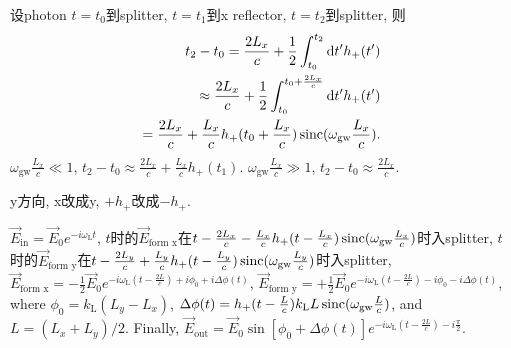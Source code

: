 设photon $t=t_0$到splitter, $t=t_1$到x reflector, $t=t_2$到splitter, 则
\begin{eqnarray}
    t_2-t_0=\frac{2L_x}{c}+\frac{1}{2}\int^{t_2}_{t_0}\mathrm{d} t'h_+(t')\\
    \approx\frac{2L_x}{c}+\frac{1}{2}\int^{t_0+\frac{2L_x}{c}}_{t_0}\mathrm{d} t'h_+(t')\\
    =\frac{2L_x}{c}+\frac{L_x}{c}h_+(t_0+\frac{L_x}{c})\operatorname{sinc}(\omega_\text{gw}\frac{L_x}{c}).
\end{eqnarray}
$\omega_\text{gw}\frac{L_x}{c}\ll1$, $t_2-t_0\approx\frac{2L_x}{c}+\frac{L_x}{c}h_+(t_1)$. $\omega_\text{gw}\frac{L_x}{c}\gg1$, $t_2-t_0\approx\frac{2L_x}{c}$.

y方向, x改成y, $+h_+$改成$-h_+$.

$\vec{E}_\text{in}=\vec{E}_0e^{-i\omega_\text{L}t}$, $t$时的$\vec{E}_\text{form x}$在$t-\frac{2L_x}{c}-\frac{L_x}{c}h_+(t-\frac{L_x}{c})\operatorname{sinc}(\omega_\text{gw}\frac{L_x}{c})$时入splitter, $t$时的$\vec{E}_\text{form y}$在$t-\frac{2L_y}{c}+\frac{L_y}{c}h_+(t-\frac{L_y}{c})\operatorname{sinc}(\omega_\text{gw}\frac{L_y}{c})$时入splitter, $\vec{E}_\text{form x}=-\frac{1}{2}\vec{E}_0e^{-i\omega_\text{L}(t-\frac{2L}{c})+i\phi_0+i\Delta\phi(t)}$, $\vec{E}_\text{form y}=+\frac{1}{2}\vec{E}_0e^{-i\omega_\text{L}(t-\frac{2L}{c})-i\phi_0-i\Delta\phi(t)}$, where $\phi_0=k_\text{L}(L_y-L_x)$, $\Delta\phi(t)=h_+(t-\frac{L}{c})k_\text{L}L\operatorname{sinc}(\omega_\text{gw}\frac{L}{c})$, and $L=(L_x+L_y)/2$. Finally, $\vec{E}_\text{out}=\vec{E}_0\sin[\phi_0+\Delta\phi(t)]e^{-i\omega_\text{L}(t-\frac{2L}{c})-i\frac{\pi}{2}}$.
